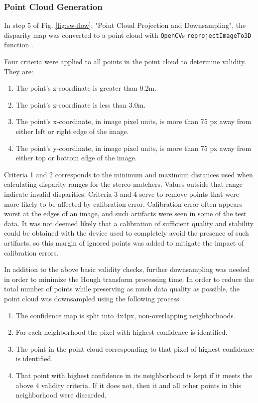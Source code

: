 \subsubsection{Point Cloud Generation}

In step 5 of Fig. \ref{fig:sw-flow}, "Point Cloud Projection and Downsampling", the disparity map was converted 
to a point cloud with \texttt{OpenCV}s \texttt{reprojectImageTo3D} function \cite{bradski_opencv_2000}.

Four criteria were applied to all points in the point cloud to determine validity. They are:
\begin{enumerate}
    \item The point's z-coordinate is greater than 0.2m. 
    \item The point's z-coordinate is less than 3.0m. 
    \item The point's x-coordinate, in image pixel units, is more than 75 px away from either left or right edge of the image.
    \item The point's y-coordinate, in image pixel units, is more than 75 px away from either top or bottom edge of the image.
\end{enumerate}

Criteria 1 and 2 corresponds to the minimum and maximum distances used when calculating disparity ranges for the stereo matchers. Values outside
that range indicate invalid disparities. Criteria 3 and 4 serve to remove points that were more likely to be affected by calibration error. Calibration 
error often appears worst at the edges of an image, and such artifacts were seen in some of the test data. It was not deemed likely that a 
calibration of sufficient quality and stability could be obtained with the device used to completely avoid the presence of such artifacts, 
so this margin of ignored points was added to mitigate the impact of calibration errors.

In addition to the above basic validity checks, further downsampling was needed in order to minimize the Hough transform 
processing time. In order to reduce the total number of points while preserving as much data quality as possible,
the point cloud was downsampled using the following process:
\begin{enumerate}
    \item The confidence map is split into 4x4px, non-overlapping neighborhoods.
    \item For each neighborhood the pixel with highest confidence is identified.
    \item The point in the point cloud corresponding to that pixel of highest confidence is identified.
    \item That point with highest confidence in its neighborhood is kept if it meets the above 4 validity criteria. If it
        does not, then it and all other points in this neighborhood were discarded.
\end{enumerate}

